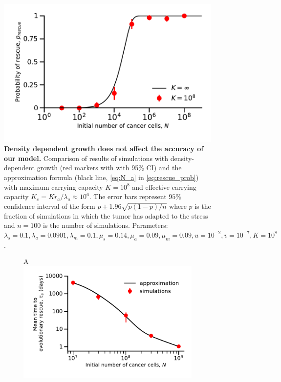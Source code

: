 \documentclass[12pt]{extarticle}
\renewcommand{\Delta}{r}
\begin{document}
\begin{appendices}
\begin{figure}[h]
\vspace*{1\baselineskip}
\includegraphics[width=1\textwidth]{Figures/SurvPlotNDataLogisticK.pdf}
\caption{\textbf{Density dependent growth does not affect the accuracy of our model.} Comparison of results of simulations  with density-dependent growth (red markers with with 95\% CI) and the approximation formula (black line, \cref{eq:N_a} in \cref{eq:rescue_prob}) with maximum carrying capacity $K=10^8$ and effective carrying capacity $K_e=K\Delta_a/\lambda_a\approx10^6$. The error bars represent $95\%$ confidence interval of the form $p\pm1.96\sqrt{p\left(1-p\right)/n}$ where $p$ is the  fraction of simulations in which the tumor has adapted to the stress and $n=100$ is the number of simulations. Parameters: $\lambda_s=0.1,\lambda_a=0.0901,\lambda_m=0.1,\mu_s=0.14,\mu_a=0.09,\mu_m=0.09, u=10^{-2}, v=10^{-7}, K=10^8$.}
\label{LogisticPlot}
\end{figure}
\begin{figure}[!htb]
\begin{subfigure}{0.5\textwidth}
A\\
\includegraphics[width=1\textwidth]{Figures/EvolutionaryRescueTime.pdf}

\end{subfigure}
\end{figure}
\end{appendices}
\end{document}

